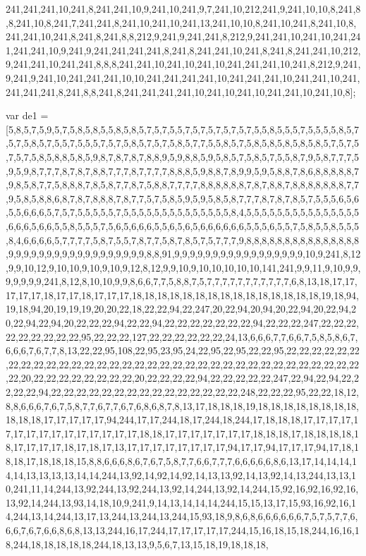 241,241,241,10,241,8,241,241,10,9,241,10,241,9,7,241,10,212,241,9,241,10,10,8,241,8,8,241,10,8,241,7,241,241,8,241,10,241,10,241,13,241,10,10,8,241,10,241,8,241,10,8,241,241,10,241,8,241,8,241,8,8,212,9,241,9,241,241,8,212,9,241,241,10,241,10,241,241,241,241,10,9,241,9,241,241,241,241,8,241,8,241,241,10,241,8,241,8,241,241,10,212,9,241,241,10,241,241,8,8,8,241,241,10,241,10,241,10,241,241,241,10,241,8,212,9,241,9,241,9,241,10,241,241,241,10,10,241,241,241,241,10,241,241,241,10,241,241,10,241,241,241,241,8,241,8,8,241,8,241,241,241,241,10,241,10,241,10,241,241,10,241,10,8];
 

var de1 = [5,8,5,7,5,9,5,7,5,8,5,8,5,5,8,5,8,5,7,5,7,5,5,7,5,7,5,7,5,7,5,7,5,5,8,5,5,5,7,5,5,5,5,8,5,7,5,7,5,8,5,7,5,5,7,5,5,5,7,5,7,5,8,5,7,5,7,5,8,5,7,7,5,5,8,5,7,5,8,5,8,5,8,5,8,5,8,5,7,5,7,5,7,5,7,5,8,5,8,8,5,8,5,9,8,7,8,7,8,7,8,8,9,5,9,8,8,5,9,5,8,5,7,5,8,5,7,5,5,8,7,9,5,8,7,7,7,5,9,5,9,8,7,7,7,8,7,8,7,8,8,7,7,7,8,7,7,7,7,8,8,8,5,9,8,8,7,8,9,9,5,9,5,8,8,7,8,6,8,8,8,8,8,7,9,8,5,8,7,7,5,8,8,8,7,8,5,8,7,7,8,7,5,8,8,7,7,7,7,8,8,8,8,8,8,7,8,7,8,8,7,8,8,8,8,8,8,8,7,7,9,5,8,5,8,8,6,8,7,8,7,8,8,8,7,8,7,7,5,7,5,8,5,9,5,9,5,8,5,8,7,7,7,8,7,8,7,8,5,7,5,5,5,6,5,6,5,5,6,6,6,5,7,5,7,5,5,5,5,5,7,5,5,5,5,5,5,5,5,5,5,5,5,5,5,8,4,5,5,5,5,5,5,5,5,5,5,5,5,5,5,5,6,6,6,5,6,6,5,5,8,5,5,5,7,5,6,5,6,6,6,5,5,6,5,6,5,6,6,6,6,6,6,5,5,5,6,5,5,7,5,8,5,5,8,5,5,5,8,4,6,6,6,6,5,7,7,7,7,5,8,7,5,5,7,8,7,7,5,8,7,8,5,7,5,7,7,7,9,8,8,8,8,8,8,8,8,8,8,8,8,8,8,8,9,9,9,9,9,9,9,9,9,9,9,9,9,9,9,9,9,9,8,8,91,9,9,9,9,9,9,9,9,9,9,9,9,9,9,9,9,9,10,9,241,8,12,9,9,10,12,9,10,10,9,10,9,10,9,12,8,12,9,9,10,9,10,10,10,10,10,141,241,9,9,11,9,10,9,9,9,9,9,9,9,241,8,12,8,10,10,9,9,8,6,6,7,7,5,8,8,7,5,7,7,7,7,7,7,7,7,7,7,7,6,8,13,18,17,17,17,17,17,18,17,17,18,17,17,17,18,18,18,18,18,18,18,18,18,18,18,18,18,18,18,19,18,94,19,18,94,20,19,19,19,20,20,22,18,22,22,94,22,247,20,22,94,20,94,20,22,94,20,22,94,20,22,94,22,94,20,22,22,22,94,22,22,94,22,22,22,22,22,22,22,94,22,22,22,247,22,22,22,22,22,22,22,22,22,95,22,22,22,127,22,22,22,22,22,22,24,13,6,6,6,7,7,6,6,7,5,8,5,8,6,7,6,6,6,7,6,7,7,8,13,22,22,95,108,22,95,23,95,24,22,95,22,95,22,22,95,22,22,22,22,22,22,22,22,22,22,22,22,22,22,22,22,22,22,22,22,22,22,22,22,22,22,22,22,22,22,22,22,22,22,22,20,22,22,22,22,22,22,22,22,20,22,22,22,22,94,22,22,22,22,22,247,22,94,22,94,22,22,22,22,94,22,22,22,22,22,22,22,22,22,22,22,22,22,22,22,248,22,22,22,95,22,22,18,12,8,8,6,6,6,7,6,7,5,8,7,7,6,7,7,6,7,6,8,6,8,7,8,13,17,18,18,18,19,18,18,18,18,18,18,18,18,18,18,18,17,17,17,17,17,94,244,17,17,244,18,17,244,18,244,17,18,18,18,17,17,17,17,17,17,17,17,17,17,17,17,17,17,17,18,18,17,17,17,17,17,17,17,18,18,18,17,18,18,18,18,18,17,17,17,17,18,17,18,17,13,17,17,17,17,17,17,17,17,94,17,17,94,17,17,17,94,17,18,18,18,17,18,18,18,15,8,8,6,6,6,8,6,7,6,7,5,8,7,7,6,6,7,7,7,6,6,6,6,6,8,6,13,17,14,14,14,14,14,13,13,13,13,14,14,244,13,92,14,92,14,92,14,13,13,92,14,13,92,14,13,244,13,13,10,241,11,14,244,13,92,244,13,92,244,13,92,14,244,13,92,14,244,15,92,16,92,16,92,16,13,92,14,244,13,93,14,18,10,9,241,9,14,13,14,14,14,244,15,15,13,17,15,93,16,92,16,14,244,13,14,244,13,17,13,244,13,244,13,244,15,93,18,9,8,6,8,6,6,6,6,6,6,7,5,7,5,7,7,6,6,6,7,6,7,6,6,8,6,8,13,13,244,16,17,244,17,17,17,17,17,244,15,16,18,15,18,244,16,16,18,244,18,18,18,18,18,244,18,13,13,9,5,6,7,13,15,18,19,18,18,18,